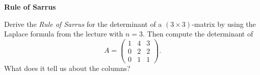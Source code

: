 \textbf{Rule of Sarrus}

Derive the \textit{Rule of Sarrus} for the determinant of a $(3 \times 3)$-matrix by using the Laplace formula from the lecture with $n=3$. Then compute the determinant of
$$A = \begin{pmatrix}
1 & 4 & 3\\
0 & 2 & 2\\
0 & 1 & 1
\end{pmatrix}.$$
What does it tell us about the columns?


